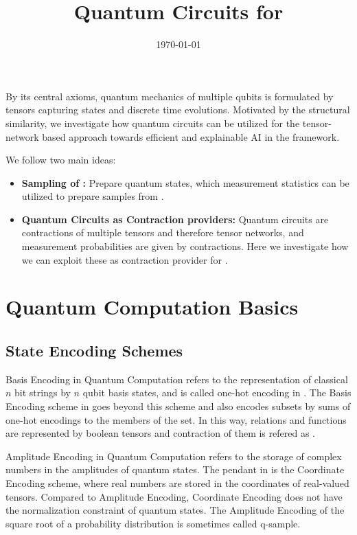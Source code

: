 \documentclass[aps,onecolumn,nofootinbib,pra]{article}
\begin{document}
    \title{Quantum Circuits for \tnreason{}}

    \maketitle
    \date{\today}

    By its central axioms, quantum mechanics of multiple qubits is formulated by tensors capturing states and discrete time evolutions.
    Motivated by the structural similarity, we investigate how quantum circuits can be utilized for the tensor-network based approach towards efficient and explainable AI in the \tnreason{} framework.

    We follow two main ideas:
    \begin{itemize}
        \item \textbf{Sampling of \ComputationActivationNetworks{}:} Prepare quantum states, which measurement statistics can be utilized to prepare samples from \ComputationActivationNetworks{}.
        \item \textbf{Quantum Circuits as Contraction providers:} Quantum circuits are contractions of multiple tensors and therefore tensor networks, and measurement probabilities are given by contractions.
        Here we investigate how we can exploit these as contraction provider for \tnreason{}.
    \end{itemize}

    \tableofcontents


    \section{Quantum Computation Basics}

    \subsection{State Encoding Schemes}

    Basis Encoding in Quantum Computation refers to the representation of classical $n$ bit strings by $n$ qubit basis states, and is called one-hot encoding in \tnreason{}.
    The Basis Encoding scheme in \tnreason{} goes beyond this scheme and also encodes subsets by sums of one-hot encodings to the members of the set.
    In this way, relations and functions are represented by boolean tensors and contraction of them is refered as \BasisCalculus{}.

    Amplitude Encoding in Quantum Computation refers to the storage of complex numbers in the amplitudes of quantum states.
    The pendant in \tnreason{} is the Coordinate Encoding scheme, where real numbers are stored in the coordinates of real-valued tensors.
    Compared to Amplitude Encoding, Coordinate Encoding does not have the normalization constraint of quantum states.
    The Amplitude Encoding of the square root of a probability distribution is sometimes called q-sample.
\end{document}
